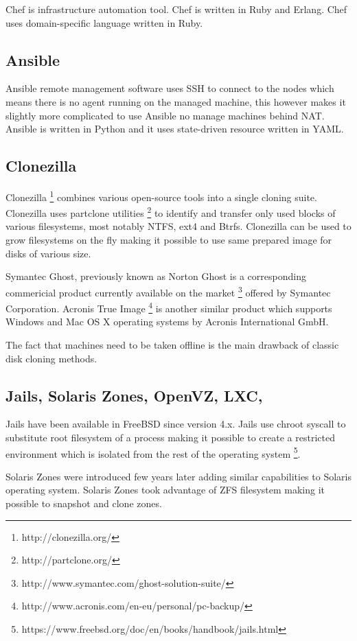 \documentclass{article}
\begin{document}
Chef is infrastructure automation tool. Chef is written in Ruby and Erlang. Chef uses domain-specific language written in Ruby.

\subsection{Ansible}

Ansible remote management software uses SSH to connect to the nodes which
means there is no agent running on the managed machine, this however makes
it slightly more complicated to use Ansible no manage machines behind NAT.
Ansible is written in Python and it uses state-driven resource 
written in YAML.

\subsection{Clonezilla}

Clonezilla \footnote{http://clonezilla.org/}
combines various open-source tools into a single cloning suite.
Clonezilla uses partclone utilities \footnote{http://partclone.org/} to
identify and transfer only used blocks of various filesystems, most notably
NTFS, ext4 and Btrfs. Clonezilla can be used to grow filesystems on the fly
making it possible to use same prepared image for disks of various size.

Symantec Ghost, previously known as Norton Ghost is a corresponding commericial
product currently available on the market
\footnote{http://www.symantec.com/ghost-solution-suite/}
offered by Symantec Corporation.
Acronis True Image
\footnote{http://www.acronis.com/en-eu/personal/pc-backup/}
is another similar product which supports Windows
and Mac OS X operating systems by Acronis International GmbH.

The fact that machines need to be taken offline is the main
drawback of classic disk cloning methods. 

\subsection{Jails, Solaris Zones, OpenVZ, LXC, }

Jails have been available in FreeBSD since version 4.x. Jails use chroot
syscall to substitute root filesystem of a process making it possible to
create a restricted environment which is isolated from the rest of the
operating system
\footnote{https://www.freebsd.org/doc/en/books/handbook/jails.html}.

Solaris Zones were introduced few years later adding similar capabilities to Solaris operating system. Solaris Zones took advantage of ZFS filesystem making it possible to snapshot and clone zones.
\end{document}
